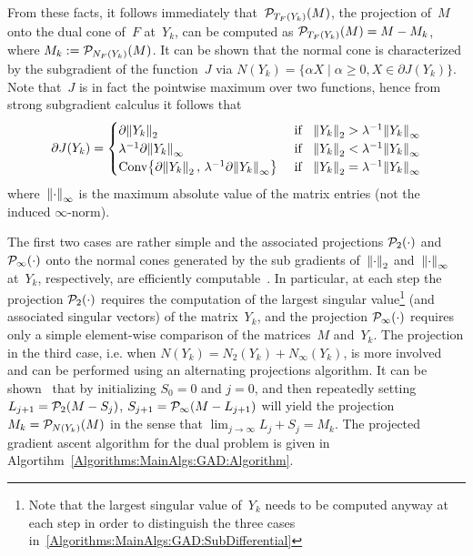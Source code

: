 From these facts, it follows immediately that~${\mathcal{P}}_{T_F(Y_k)}(M)$, the projection of~$M$ onto the dual cone of~$F$ at~$Y_k$, can be computed as ${\mathcal{P}}_{T_F(Y_k)}(M) = M - M_k$, where $M_k := {\mathcal{P}}_{N_F(Y_k)}(M)$. It can be shown that the normal cone is characterized by the subgradient of the function~$J$ via $N(Y_k) = \{\alpha X \mid \alpha \geq0, X\in \partial J(Y_k) \}$. Note that~$J$ is in fact the pointwise maximum over two functions, hence from strong subgradient calculus it follows that
%
\begin{align}
\partial J(Y_k) = \begin{cases}  
\partial {\left\|Y_k\right\|}_{2}^{} &\text{ if }\;\; {\left\|Y_k\right\|}_{2}^{} > \lambda^{-1}{\left\|Y_k\right\|}_{\infty}^{} \\
\lambda^{-1} \partial {\left\|Y_k\right\|}_{\infty}^{} &\text{ if }\;\;  {\left\|Y_k\right\|}_{2}^{} < \lambda^{-1}{\left\|Y_k\right\|}_{\infty}^{} \\
\operatorname{Conv}\!\left\{\partial {\left\|Y_k\right\|}_{2}^{} \,,\, \lambda^{-1}\partial {\left\|Y_k\right\|}_{\infty}^{}\right\} &\text{ if }\;\; {\left\|Y_k\right\|}_{2}^{} = \lambda^{-1}{\left\|Y_k\right\|}_{\infty}^{} \\
\end{cases}
\label{Algorithms:MainAlgs:GAD:SubDifferential}
\end{align}
%
where~${\left\|\cdot\right\|}_{\infty}^{}$ is the maximum absolute value of the matrix entries (not the induced $\infty$-norm). 

The first two cases are rather simple and the associated projections ${\mathcal{P}}_{2}(\cdot)$ and ${\mathcal{P}}_{\infty}(\cdot)$ onto the normal cones generated by the sub gradients of~${\left\|\cdot\right\|}_{2}^{}$ and~${\left\|\cdot\right\|}_{\infty}^{}$ at~$Y_k$, respectively,  are efficiently computable~\cite{Lin:2009kx}. In particular, at each step the projection ${\mathcal{P}}_{2}(\cdot)$ requires the computation of the largest singular value\footnote{Note that the largest singular value of~$Y_k$ needs to be computed anyway at each step in order to distinguish the three cases in~\eqref{Algorithms:MainAlgs:GAD:SubDifferential}} (and associated singular vectors) of the matrix~$Y_k$, and the projection ${\mathcal{P}}_{\infty}(\cdot)$ requires only a simple element-wise comparison of the matrices~$M$ and~$Y_k$. The projection in the third case, i.e. when $N(Y_k) = N_2(Y_k) + N_\infty(Y_k)$, is more involved and can be performed using an alternating projections algorithm. It can be shown~\cite{Lin:2009kx} that by initializing $S_0 = 0$ and $j=0$, and then repeatedly setting $L_{j+1} = {\mathcal{P}}_{2}(M-S_j)$, $S_{j+1} = {\mathcal{P}}_{\infty}(M-L_{j+1})$ will yield the projection~$M_k = {\mathcal{P}}_{N(Y_k)}(M)$ in the sense that $\lim_{j\rightarrow \infty} L_j+S_j = M_k$. The projected gradient ascent algorithm for the dual problem is given in Algortihm~\eqref{Algorithms:MainAlgs:GAD:Algorithm}.

